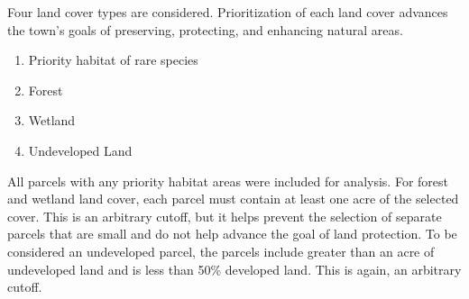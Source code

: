 \documentclass[12pt, stu, floatsintext,table]{apa7}
\begin{document}
\begin{table}[htbp]
  \centering
  \caption{Types of land protection and sample of land protected in Franklin, MA. Most land is categorized as protected in perpetuity. This is land that is legally protected and often owned by the municipality or state. Land protected in a limited status is legally protected, but not in perpetuity.}
\end{table}

Four land cover types are considered. Prioritization of each land cover advances the town's goals of preserving, protecting, and enhancing natural areas. 
\begin{enumerate}
\setlength\itemsep{0.0em}
    \item Priority habitat of rare species
    \item Forest
    \item Wetland
    \item Undeveloped Land
\end{enumerate}  
All parcels with any priority habitat areas were included for analysis. For forest and wetland land cover, each parcel must contain at least one acre of the selected cover. This is an arbitrary cutoff, but it helps prevent the selection of separate parcels that are small and do not help advance the goal of land protection. To be considered an undeveloped parcel, the parcels include greater than an acre of undeveloped land and is less than 50\% developed land. This is again, an arbitrary cutoff. 
\end{document}
